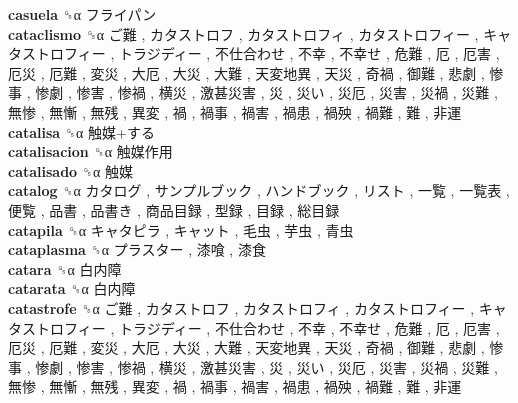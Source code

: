 \textbf{casuela} ␝α   フライパン   \\
\textbf{cataclismo} ␝α   ご難 ,  カタストロフ ,  カタストロフィ ,  カタストロフィー ,  キャタストロフィー ,  トラジディー ,  不仕合わせ ,  不幸 ,  不幸せ ,  危難 ,  厄 ,  厄害 ,  厄災 ,  厄難 ,  変災 ,  大厄 ,  大災 ,  大難 ,  天変地異 ,  天災 ,  奇禍 ,  御難 ,  悲劇 ,  惨事 ,  惨劇 ,  惨害 ,  惨禍 ,  横災 ,  激甚災害 ,  災 ,  災い ,  災厄 ,  災害 ,  災禍 ,  災難 ,  無惨 ,  無慚 ,  無残 ,  異変 ,  禍 ,  禍事 ,  禍害 ,  禍患 ,  禍殃 ,  禍難 ,  難 ,  非運   \\
\textbf{catalisa} ␝α   触媒+する   \\
\textbf{catalisacion} ␝α   触媒作用   \\
\textbf{catalisado} ␝α   触媒   \\
\textbf{catalog} ␝α   カタログ ,  サンプルブック ,  ハンドブック ,  リスト ,  一覧 ,  一覧表 ,  便覧 ,  品書 ,  品書き ,  商品目録 ,  型録 ,  目録 ,  総目録   \\
\textbf{catapila} ␝α   キャタピラ ,  キャット ,  毛虫 ,  芋虫 ,  青虫   \\
\textbf{cataplasma} ␝α   プラスター ,  漆喰 ,  漆食   \\
\textbf{catara} ␝α   白内障   \\
\textbf{catarata} ␝α   白内障   \\
\textbf{catastrofe} ␝α   ご難 ,  カタストロフ ,  カタストロフィ ,  カタストロフィー ,  キャタストロフィー ,  トラジディー ,  不仕合わせ ,  不幸 ,  不幸せ ,  危難 ,  厄 ,  厄害 ,  厄災 ,  厄難 ,  変災 ,  大厄 ,  大災 ,  大難 ,  天変地異 ,  天災 ,  奇禍 ,  御難 ,  悲劇 ,  惨事 ,  惨劇 ,  惨害 ,  惨禍 ,  横災 ,  激甚災害 ,  災 ,  災い ,  災厄 ,  災害 ,  災禍 ,  災難 ,  無惨 ,  無慚 ,  無残 ,  異変 ,  禍 ,  禍事 ,  禍害 ,  禍患 ,  禍殃 ,  禍難 ,  難 ,  非運   \\

